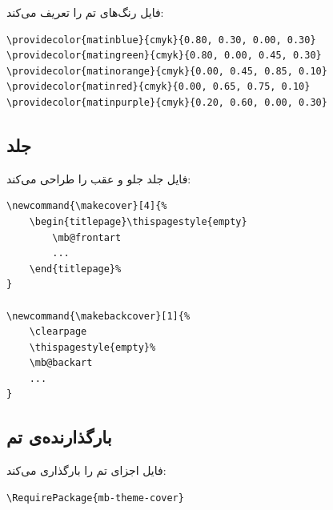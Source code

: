 فایل  رنگ‌های تم
را تعریف می‌کند:

\begin{latin}
\begin{verbatim}
\providecolor{matinblue}{cmyk}{0.80, 0.30, 0.00, 0.30}
\providecolor{matingreen}{cmyk}{0.80, 0.00, 0.45, 0.30}
\providecolor{matinorange}{cmyk}{0.00, 0.45, 0.85, 0.10}
\providecolor{matinred}{cmyk}{0.00, 0.65, 0.75, 0.10}
\providecolor{matinpurple}{cmyk}{0.20, 0.60, 0.00, 0.30}
\end{verbatim}
\end{latin}


\subsection{جلد}
\label{sec:themes-cover}

فایل  جلد جلو و
عقب را طراحی می‌کند:

\begin{latin}
\begin{verbatim}
\newcommand{\makecover}[4]{%
    \begin{titlepage}\thispagestyle{empty}
        \mb@frontart
        ...
    \end{titlepage}%
}

\newcommand{\makebackcover}[1]{%
    \clearpage
    \thispagestyle{empty}%
    \mb@backart
    ...
}
\end{verbatim}
\end{latin}


\subsection{بارگذارنده‌ی تم}
\label{sec:themes-loader}

فایل  اجزای تم
را بارگذاری می‌کند:

\begin{latin}
\begin{verbatim}
\RequirePackage{mb-theme-cover}
\end{verbatim}
\end{latin}


